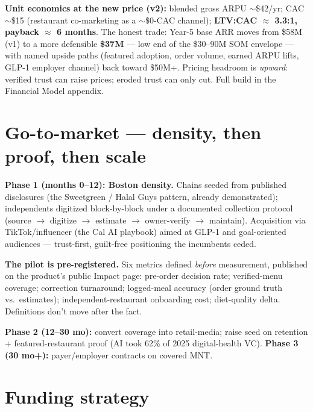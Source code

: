 \documentclass[10pt]{article}
\begin{document}
\vspace{4pt}
\textbf{Unit economics at the new price (v2):} blended gross ARPU $\sim$\$42/yr; CAC $\sim$\$15 (restaurant co-marketing as a $\sim$\$0-CAC channel); \textbf{LTV:CAC $\approx$ 3.3:1, payback $\approx$ 6 months}. The honest trade: Year-5 base ARR moves from \$58M (v1) to a more defensible \textbf{\$37M} --- low end of the \$30--90M SOM envelope --- with named upside paths (featured adoption, order volume, earned ARPU lifts, GLP-1 employer channel) back toward \$50M+. Pricing headroom is \emph{upward}: verified trust can raise prices; eroded trust can only cut. Full build in the Financial Model appendix.

\section{Go-to-market --- density, then proof, then scale}

\textbf{Phase 1 (months 0--12): Boston density.} Chains seeded from published disclosures (the Sweetgreen / Halal Guys pattern, already demonstrated); independents digitized block-by-block under a documented collection protocol (source $\to$ digitize $\to$ estimate $\to$ owner-verify $\to$ maintain). Acquisition via TikTok/influencer (the Cal AI playbook) aimed at GLP-1 and goal-oriented audiences --- trust-first, guilt-free positioning the incumbents ceded.

\textbf{The pilot is pre-registered.} Six metrics defined \emph{before} measurement, published on the product's public Impact page: pre-order decision rate; verified-menu coverage; correction turnaround; logged-meal accuracy (order ground truth vs.\ estimates); independent-restaurant onboarding cost; diet-quality delta. Definitions don't move after the fact.

\textbf{Phase 2 (12--30 mo):} convert coverage into retail-media; raise seed on retention + featured-restaurant proof (AI took 62\% of 2025 digital-health VC). \quad \textbf{Phase 3 (30 mo+):} payer/employer contracts on covered MNT.

\section{Funding strategy}
\end{document}
